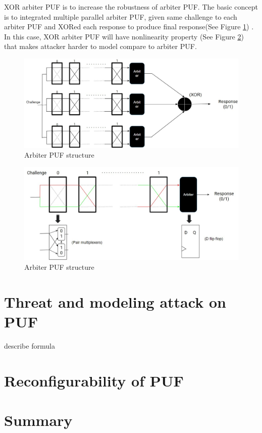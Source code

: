 XOR arbiter PUF is to increase the robustness of arbiter PUF. The basic concept is to integrated multiple parallel arbiter PUF, given same challenge to each arbiter PUF and XORed each response to produce final response(See Figure \ref{fig:figure7}) \cite{Reference5}.
In this case, XOR arbiter PUF will have nonlinearity property (See Figure \ref{fig:figure8}) that makes attacker harder to model compare to arbiter PUF.

\begin{figure}[htp]
    \centering
    \includegraphics[width=12cm]{figures/figure7.jpg}
    \caption{Arbiter PUF structure}
    \label{fig:figure7}
    \end{figure}

\begin{figure}[htp]
    \centering
    \includegraphics[width=12cm]{figures/figure6.jpg}
    \caption{Arbiter PUF structure}
    \label{fig:figure8}
    \end{figure}

\section{Threat and modeling attack on PUF}
describe formula

\section{Reconfigurability of PUF}



\section{Summary}


